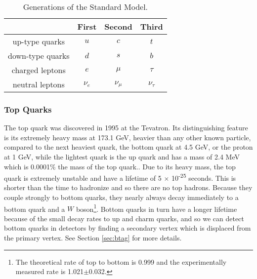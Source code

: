 \begin{table}[!htb]
	\centering
	\caption{Generations of the Standard Model.}
	\begin{tabular}{c||c|c|c|}
		\hline 
			&	First	&	Second		&	Third \\
		\hline \hline
		up-type quarks	&	$u$ 	 &	$c$ &	$t$	\\
		down-type	 quarks &	$d$ &	$s$ &	$b$	\\
		charged leptons 	& $e$	&	$\mu$	&	$\tau$ \\
		neutral leptons	&	 $\nu_e$	& $\nu_{\mu}$	&	$\nu_{\tau}$	\\
		\hline \hline			
	\end{tabular}
	\label{tab:generations}
\end{table}		



		
	
	
	\subsubsection{Top Quarks}
	
The top quark was discovered in 1995 at the Tevatron\cite{topdiscovery}.  Its distinguishing feature is its extremely heavy mass at 173.1 GeV, heavier than any other known particle, compared to the next heaviest quark, the bottom quark at 4.5 GeV, or the proton at 1 GeV, while the lightest quark is the up quark and has a mass of 2.4 MeV which is 0.0001\% the mass of the top quark..  Due to its heavy mass, the top quark is extremely unstable and have a lifetime of 5 $\times$ 10\textsuperscript{-25} seconds. This is shorter than the time to hadronize and so there are no top hadrons.  Because they couple strongly to bottom quarks, they nearly always decay immediately to a bottom quark and a $W$ boson\footnote{The theoretical rate of top to bottom is 0.999 and the experimentally measured rate is 1.021$\pm$0.032\cite{pdg}.}.  Bottom quarks in turn have a longer lifetime because of the small decay rates to up and charm quarks, and so we can detect bottom quarks in detectors by finding a secondary vertex which is displaced from the primary vertex.  See Section \ref{sec:btag} for more details. \\

